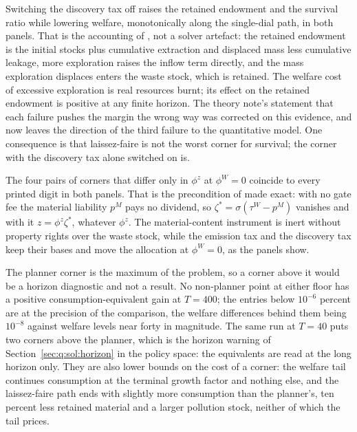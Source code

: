  Switching the discovery tax off raises the retained endowment and the survival ratio while lowering welfare, monotonically along the single-dial path, in both panels. That is the accounting of , not a solver artefact: the retained endowment is the initial stocks plus cumulative extraction and displaced mass less cumulative leakage, more exploration raises the inflow term directly, and the mass exploration displaces enters the waste stock, which is retained. The welfare cost of excessive exploration is real resources burnt; its effect on the retained endowment is positive at any finite horizon. The theory note's statement that each failure pushes the margin the wrong way was corrected on this evidence, and  now leaves the direction of the third failure to the quantitative model. One consequence is that laissez-faire is not the worst corner for survival; the corner with the discovery tax alone switched on is.

 The four pairs of corners that differ only in $\phi^z$ at $\phi^W=0$ coincide to every printed digit in both panels. That is the precondition of  made exact: with no gate fee the material liability $p^M$ pays no dividend, so $\zeta^{\ast}=\sigma(\tau^W-p^M)$ vanishes and with it $z=\phi^z\zeta^{\ast}$, whatever $\phi^z$. The material-content instrument is inert without property rights over the waste stock, while the emission tax and the discovery tax keep their bases and move the allocation at $\phi^W=0$, as the panels show.

 The planner corner is the maximum of the problem, so a corner above it would be a horizon diagnostic and not a result. No non-planner point at either floor has a positive consumption-equivalent gain at $T=400$; the entries below $10^{-6}$ percent are at the precision of the comparison, the welfare differences behind them being $10^{-8}$ against welfare levels near forty in magnitude. The same run at $T=40$ puts two corners above the planner, which is the horizon warning of Section~\ref{sec:q:sol:horizon} in the policy space: the equivalents are read at the long horizon only. They are also lower bounds on the cost of a corner: the welfare tail continues consumption at the terminal growth factor and nothing else, and the laissez-faire path ends with slightly more consumption than the planner's, ten percent less retained material and a larger pollution stock, neither of which the tail prices.


